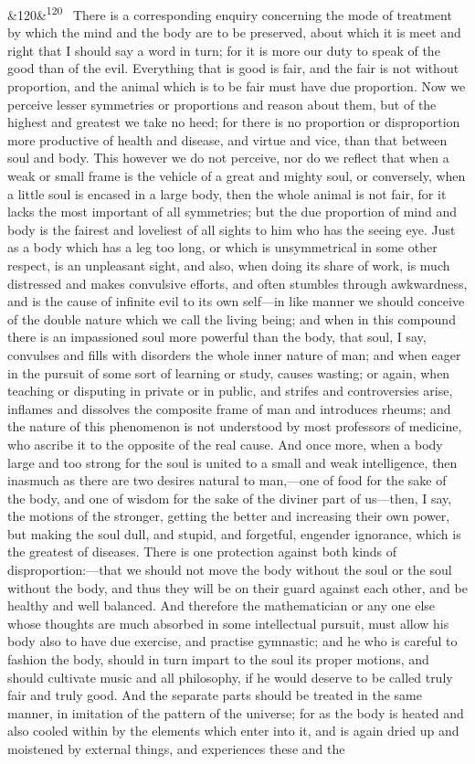 \documentclass[12pt]{article}
\newcommand{\para}[1][]{\par\noindent\ifx&#1&\else\textsuperscript{\footnotesize #1}~\fi}
\begin{document}
\para[120] There is a corresponding enquiry concerning the mode of treatment by which the mind and the body are to be preserved, about which it is meet and right that I should say a word in turn; for it is more our duty to speak of the good than of the evil. Everything that is good is fair, and the fair is not without proportion, and the animal which is to be fair must have due proportion. Now we perceive lesser symmetries or proportions and reason about them, but of the highest and greatest we take no heed; for there is no proportion or disproportion more productive of health and disease, and virtue and vice, than that between soul and body. This however we do not perceive, nor do we reflect that when a weak or small frame is the vehicle of a great and mighty soul, or conversely, when a little soul is encased in a large body, then the whole animal is not fair, for it lacks the most important of all symmetries; but the due proportion of mind and body is the fairest and loveliest of all sights to him who has the seeing eye. Just as a body which has a leg too long, or which is unsymmetrical in some other respect, is an unpleasant sight, and also, when doing its share of work, is much distressed and makes convulsive efforts, and often stumbles through awkwardness, and is the cause of infinite evil to its own self---in like manner we should conceive of the double nature which we call the living being; and when in this compound there is an impassioned soul more powerful than the body, that soul, I say, convulses and fills with disorders the whole inner nature of man; and when eager in the pursuit of some sort of learning or study, causes wasting; or again, when teaching or disputing in private or in public, and strifes and controversies arise, inflames and dissolves the composite frame of man and introduces rheums; and the nature of this phenomenon is not understood by most professors of medicine, who ascribe it to the opposite of the real cause. And once more, when a body large and too strong for the soul is united to a small and weak intelligence, then inasmuch as there are two desires natural to man,---one of food for the sake of the body, and one of wisdom for the sake of the diviner part of us---then, I say, the motions of the stronger, getting the better and increasing their own power, but making the soul dull, and stupid, and forgetful, engender ignorance, which is the greatest of diseases. There is one protection against both kinds of disproportion:---that we should not move the body without the soul or the soul without the body, and thus they will be on their guard against each other, and be healthy and well balanced. And therefore the mathematician or any one else whose thoughts are much absorbed in some intellectual pursuit, must allow his body also to have due exercise, and practise gymnastic; and he who is careful to fashion the body, should in turn impart to the soul its proper motions, and should cultivate music and all philosophy, if he would deserve to be called truly fair and truly good. And the separate parts should be treated in the same manner, in imitation of the pattern of the universe; for as the body is heated and also cooled within by the elements which enter into it, and is again dried up and moistened by external things, and experiences these and the 
\end{document}
